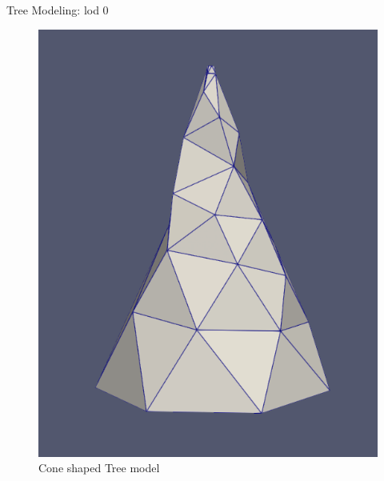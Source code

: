 \documentclass[10pt]{beamer}
\begin{document}
\begin{frame}{Tree Modeling: lod 0}
\begin{figure}[h]
\begin{minipage}{0.49\textwidth}
			\includegraphics[width=\textwidth]{images/cone.png}
			\caption{Cone shaped Tree model}
			\label{fig:figure2}
		\end{minipage}
	\end{figure}
\end{frame}
\end{document}
